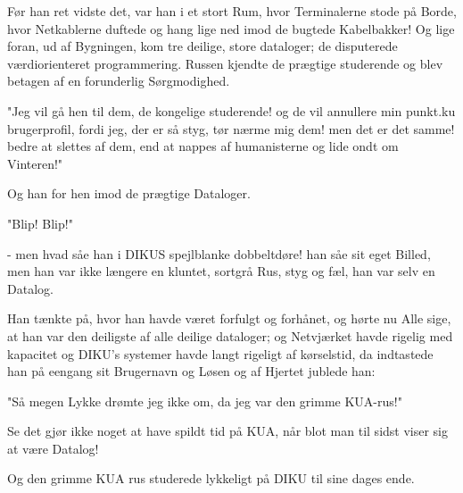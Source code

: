 \documentclass[a4paper,11pt]{article}
\begin{document}
\begin{sketch}
 Før han ret vidste det, var han i et stort Rum, hvor Terminalerne
stode på Borde, hvor Netkablerne duftede og hang lige ned imod de
bugtede Kabelbakker! Og lige foran, ud af Bygningen, kom tre deilige,
store dataloger; de disputerede værdiorienteret programmering. Russen
kjendte de prægtige studerende og blev betagen af en forunderlig Sørgmodighed.

 "Jeg vil gå hen til dem, de kongelige studerende! og de vil
annullere min punkt.ku brugerprofil, fordi jeg, der er så styg, tør
nærme mig dem! men det er det samme! bedre at slettes af dem, end at
nappes af humanisterne og lide ondt om Vinteren!"

 Og han for hen imod de prægtige Dataloger.

 "Blip! Blip!"

 - men hvad såe han i DIKUS spejlblanke dobbeltdøre! han såe sit eget
Billed, men han var ikke længere en kluntet, sortgrå Rus, styg og
fæl, han var selv en Datalog.

 Han tænkte på, hvor han havde været forfulgt og forhånet, og
hørte nu Alle sige, at han var den deiligste af alle deilige
dataloger; og Netvjærket havde rigelig med kapacitet og DIKU's
systemer havde langt rigeligt af kørselstid, da indtastede han på
eengang sit Brugernavn og Løsen og af Hjertet jublede han:

 "Så megen Lykke drømte jeg ikke om, da jeg var den grimme KUA-rus!"

 Se det gjør ikke noget at have spildt tid på KUA, når blot man til
sidst viser sig at være Datalog!


 Og den grimme KUA rus studerede lykkeligt på DIKU til sine dages ende. 


\end{sketch}
\end{document}
